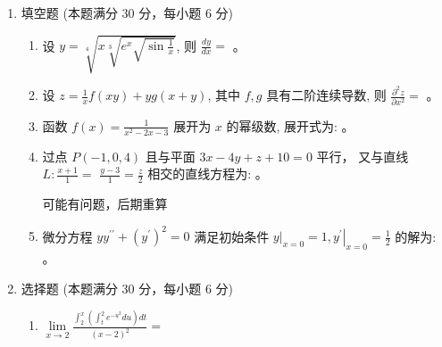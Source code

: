 
\begin{enumerate}
	\item
	填空题 (本题满分 30 分，每小题 6 分)
	\begin{enumerate}
		\item
		设 $y=\sqrt[4]{x \sqrt[3]{e^{x} \sqrt{\sin \frac{1}{x}}}}$, 则 $\frac{d y}{d x}=$   。
		\item  
设 $z=\frac{1}{x} f(x y)+y g(x+y)$, 其中 $f, g$ 具有二阶连续导数, 则 $\frac{\partial^{2} z}{\partial x^{2}}=$    。
		
		
		\item
		函数 $f(x)=\frac{1}{x^{2}-2 x-3}$ 展开为 $x$ 的幂级数, 展开式为:  。



\item
过点 $P(-1,0,4)$ 且与平面 $3 x-4 y+z+10=0$ 平行， 又与直线 $L: \frac{x+1}{1}=$ $\frac{y-3}{1}=\frac{z}{2}$ 相交的直线方程为:    。
\begin{note}
	可能有问题，后期重算
\end{note}

\item
微分方程 $y y^{\prime\prime}+\left(y^{\prime}\right)^{2}=0$ 满足初始条件 $\left.y\right|_{x=0}=1,\left.y^{\prime}\right|_{x=0}=\frac{1}{2}$ 的解为:  
 。
		
	
		
	\end{enumerate}
	
\item 
选择题 (本题满分 30 分，每小题 6 分)
\begin{enumerate}
	\item
	$ \lim\limits _{x \rightarrow 2} \frac{\int_{2}^{x}\left(\int_{t}^{2} e^{-u^{2}} du \right) d t}{(x-2)^{2}}=$  
	

\end{enumerate}
\end{enumerate}
